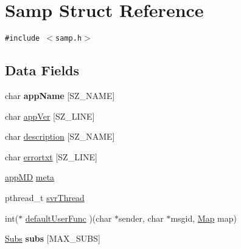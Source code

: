 \hypertarget{structSamp}{
\section{Samp Struct Reference}
\label{structSamp}
}
{\tt \#include $<$samp.h$>$}

\subsection*{Data Fields}
\begin{CompactItemize}
\item 
\hypertarget{structSamp_7d6431613bbfaf71fab0112318f3d2f4}{
char \textbf{appName} \mbox{[}SZ\_\-NAME\mbox{]}}
\label{structSamp_7d6431613bbfaf71fab0112318f3d2f4}

\item 
char \hyperlink{structSamp_bc903d82fc1310fa96fe5b4e64a30fca}{appVer} \mbox{[}SZ\_\-LINE\mbox{]}
\item 
char \hyperlink{structSamp_2c5f900be721a05d08b9eaaf024ebd42}{description} \mbox{[}SZ\_\-NAME\mbox{]}
\item 
char \hyperlink{structSamp_d3f7c585846e1e696b04807106d8087f}{errortxt} \mbox{[}SZ\_\-LINE\mbox{]}
\item 
\hyperlink{structappMD}{appMD} \hyperlink{structSamp_0884021074d1ed14342187005e0b78e7}{meta}
\item 
pthread\_\-t \hyperlink{structSamp_e7db0cac0c4ad61c9ed7f3d344b623cf}{svrThread}
\item 
int($\ast$ \hyperlink{structSamp_eb399d3fb381bee752b5747ff4cb9a9b}{defaultUserFunc} )(char $\ast$sender, char $\ast$msgid, \hyperlink{samp_8h_39a90bc041db57e1a6ba736ba91eee30}{Map} map)
\item 
\hypertarget{structSamp_5007f4ba097b7c1121f05c8d5e3b1eff}{
\hyperlink{structSubs}{Subs} \textbf{subs} \mbox{[}MAX\_\-SUBS\mbox{]}}
\label{structSamp_5007f4ba097b7c1121f05c8d5e3b1eff}


\end{CompactItemize}
